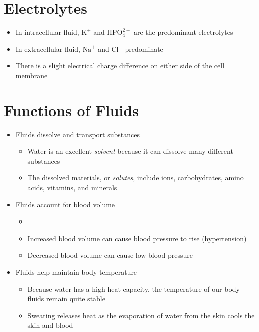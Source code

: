\documentclass[title={Chapter 7}]{fdsn201notes}
\begin{document}
\section{Electrolytes}\label{sec:electrolytes}
\begin{itemize}
	\item In intracellular fluid, $\mbox{K}^{+}$ and $\mbox{HPO}_{4}^{2-}$ are the predominant electrolytes
	\item In extracellular fluid, $\mbox{Na}^{+}$ and $\mbox{Cl}^{-}$ predominate
	\item There is a slight electrical charge difference on either side of the cell membrane
\end{itemize}

\section{Functions of Fluids}\label{sec:functions-of-fluids}
\begin{itemize}
	\item Fluids dissolve and transport substances
	\begin{itemize}
		\item Water is an excellent \emph{solvent} because it can dissolve many different substances
		\item The dissolved materials, or \emph{solutes}, include ions, carbohydrates, amino acids, vitamins, and minerals
	\end{itemize}
	\item Fluids account for blood volume
	\begin{itemize}
		\item {}
		\item Increased blood volume can cause blood pressure to rise (hypertension)
		\item Decreased blood volume can cause low blood pressure
	\end{itemize}
	\item Fluids help maintain body temperature
	\begin{itemize}
		\item Because water has a high heat capacity, the temperature of our body fluids remain quite stable
		\item Sweating releases heat as the evaporation of water from the skin cools the skin and blood
	\end{itemize}
\end{itemize}
\end{document}

